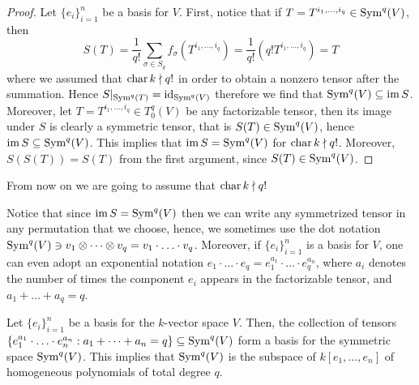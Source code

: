 \begin{proof}
  Let \(\{e_i\}_{i=1}^n\) be a basis for \(V\). First, notice that if \(T =
  T^{i_1, \dots, i_q} \in \operatorname{Sym}^q(V)\),
  then
  \[
    S(T) = \frac{1}{q!} \sum_{\sigma \in S_q} f_\sigma(T^{i_1, \dots,
    i_q}) = \frac{1}{q!} (q! T^{i_1, \dots, i_q}) = T
  \]
  where we assumed that \(\operatorname{char} k \nmid q!\) in order to obtain a nonzero tensor
  after the summation. Hence \(S|_{\operatorname{Sym}^q(T)} = \operatorname{id}_{\operatorname{Sym}^q(V)}\) therefore we
  find that \(\operatorname{Sym}^q(V) \subseteq \operatorname{im} S\). Moreover, let \(T = T^{i_1, \dots,
  i_q} \in T_0^q(V)\) be any factorizable tensor, then its image under \(S\) is
  clearly a symmetric tensor, that is \(S(T) \in \operatorname{Sym}^q(V)\), hence \(\operatorname{im} S
  \subseteq \operatorname{Sym}^q(V)\). This implies that \(\operatorname{im} S = \operatorname{Sym}^q(V)\) for \(\operatorname{char} k
  \nmid q!\). Moreover, \(S(S(T)) = S(T)\) from the first argument, since
  \(S(T) \in \operatorname{Sym}^q(V)\).
\end{proof}

\begin{remark}
  From now on we are going to assume that \(\operatorname{char} k \nmid q!\)
\end{remark}

\begin{notation}
  Notice that since \(\operatorname{im} S = \operatorname{Sym}^q(V)\) then we can write any symmetrized
  tensor in any permutation that we choose, hence, we sometimes use the dot
  notation \(\operatorname{Sym}^q(V) \ni v_1 \otimes \dots \otimes v_q = v_1 \cdot \ldots
  \cdot v_q\). Moreover, if \(\{e_i\}_{i=1}^n\) is a basis for \(V\), one can
  even adopt an exponential notation \(e_1 \cdot \ldots \cdot e_q = e_1^{a_1}
  \cdot \ldots \cdot e_q^{a_n}\), where \(a_i\) denotes the number of times the
  component \(e_i\) appears in the factorizable tensor, and \(a_1 + \dots + a_q
  = q\).
\end{notation}

\begin{proposition}
  \label{prop: basis for symmetric power}
  Let \(\{e_i\}_{i=1}^n\) be a basis for the \(k\)-vector space \(V\). Then, the
  collection of tensors \(\{e_1^{a_1} \cdot \ldots \cdot e_n^{a_n} : a_1 + \dots
  + a_n = q\} \subseteq \operatorname{Sym}^q(V)\) form a basis for the symmetric space
  \(\operatorname{Sym}^q(V)\). This implies that \(\operatorname{Sym}^q(V)\) is the subspace of \(k[e_1,
  \dots, e_n]\) of homogeneous polynomials of total degree \(q\).
\end{proposition}

